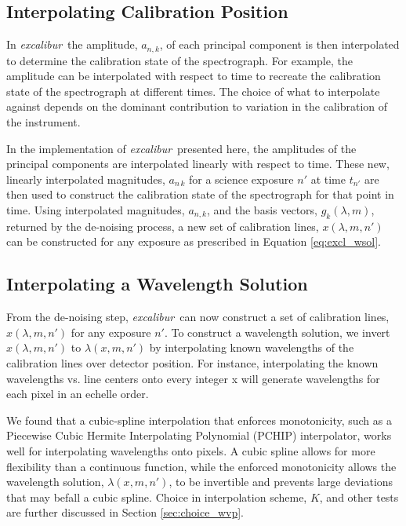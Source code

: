 \documentclass[modern]{aastex63}
\newcommand{\project}[1]{\textsl{#1}}
\newcommand{\name}{\project{excalibur}}
\begin{document}
\subsection{Interpolating Calibration Position}
 \label{sec:interp_time}
In \name\, the amplitude, $a_{n,k}$, of each principal component is then interpolated to determine the calibration state of the spectrograph.  For example, the amplitude can be interpolated with respect to time to recreate the calibration state of the spectrograph at different times.  The choice of what to interpolate against depends on the dominant contribution to variation in the calibration of the instrument.

In the implementation of \name\ presented here, the amplitudes of the principal components are interpolated linearly with respect to time.  These new, linearly interpolated magnitudes, $a_{n\,k}$ for a science exposure $n'$ at time $t_{n'}$ are then used to construct the calibration state of the spectrograph for that point in time.  Using interpolated magnitudes, $a_{n,k}$, and the basis vectors, $g_k(\lambda,m)$, returned by the de-noising process, a new set of calibration lines, $x(\lambda,m,n')$ can be constructed
 for any exposure as prescribed in Equation \ref{eq:excl_wsol}.


\subsection{Interpolating a Wavelength Solution} \label{sec:interp_wsol}
From the de-noising step, \name\ can now construct a set of calibration lines, $x(\lambda,m,n')$ for any exposure $n'$.  To construct a wavelength solution, we invert $x(\lambda,m,n')$ to $\lambda(x,m,n')$ by interpolating known wavelengths of the calibration lines over detector position.  For instance, interpolating the known wavelengths vs. line centers onto every integer x will generate wavelengths for each pixel in an echelle order.

We found that a cubic-spline interpolation that enforces monotonicity, such as a Piecewise Cubic Hermite Interpolating Polynomial (PCHIP) interpolator, works well for interpolating wavelengths onto pixels.  A cubic spline allows for more flexibility than a continuous function, while the enforced monotonicity allows the wavelength solution, $\lambda(x,m,n')$, to be invertible and prevents large deviations that may befall a cubic spline.  Choice in interpolation scheme, $K$, and other tests are further discussed in Section \ref{sec:choice_wvp}.
\end{document}
